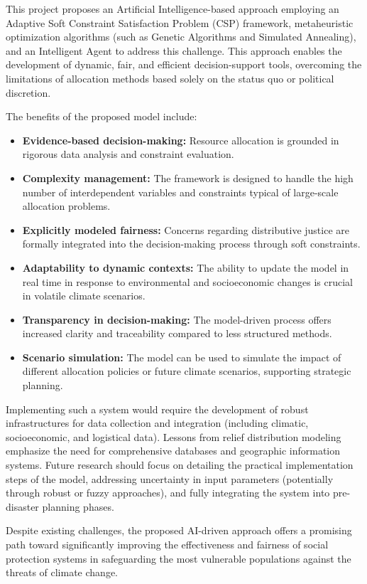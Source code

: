 This project proposes an Artificial Intelligence-based approach employing an Adaptive Soft Constraint Satisfaction Problem (CSP) framework, metaheuristic optimization algorithms (such as Genetic Algorithms and Simulated Annealing), and an Intelligent Agent to address this challenge. This approach enables the development of dynamic, fair, and efficient decision-support tools, overcoming the limitations of allocation methods based solely on the status quo or political discretion.

The benefits of the proposed model include:
\begin{itemize}
    \item \textbf{Evidence-based decision-making:} Resource allocation is grounded in rigorous data analysis and constraint evaluation.
    \item \textbf{Complexity management:} The framework is designed to handle the high number of interdependent variables and constraints typical of large-scale allocation problems.
    \item \textbf{Explicitly modeled fairness:} Concerns regarding distributive justice are formally integrated into the decision-making process through soft constraints.
    \item \textbf{Adaptability to dynamic contexts:} The ability to update the model in real time in response to environmental and socioeconomic changes is crucial in volatile climate scenarios.
    \item \textbf{Transparency in decision-making:} The model-driven process offers increased clarity and traceability compared to less structured methods.
    \item \textbf{Scenario simulation:} The model can be used to simulate the impact of different allocation policies or future climate scenarios, supporting strategic planning.
\end{itemize}

Implementing such a system would require the development of robust infrastructures for data collection and integration (including climatic, socioeconomic, and logistical data). Lessons from relief distribution modeling emphasize the need for comprehensive databases and geographic information systems. Future research should focus on detailing the practical implementation steps of the model, addressing uncertainty in input parameters (potentially through robust or fuzzy approaches), and fully integrating the system into pre-disaster planning phases.

Despite existing challenges, the proposed AI-driven approach offers a promising path toward significantly improving the effectiveness and fairness of social protection systems in safeguarding the most vulnerable populations against the threats of climate change.



